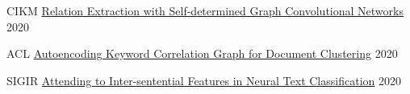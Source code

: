 

\begin{cvhonors}

  \cvhonor
    {CIKM}
    {\href{https://arxiv.org/abs/2008.00441}{Relation Extraction with Self-determined Graph Convolutional Networks}}
    {}
    {2020}

  \cvhonor
    {ACL}
    {\href{https://aclanthology.org/2020.acl-main.366.pdf}{Autoencoding Keyword Correlation Graph for Document Clustering}}
    {}
    {2020}

  \cvhonor
    {SIGIR}
    {\href{https://dl.acm.org/doi/10.1145/3397271.3401203}{Attending to Inter-sentential Features in Neural Text Classification}}
    {}
    {2020}

\end{cvhonors}
